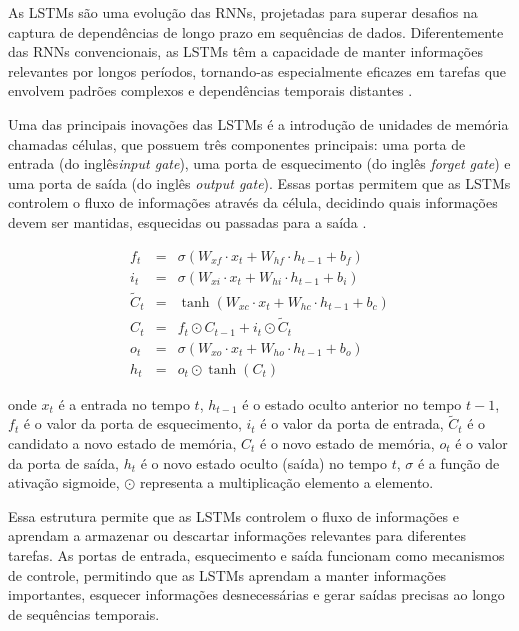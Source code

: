 As LSTMs são uma evolução das RNNs, projetadas para superar desafios na captura de dependências de longo prazo em sequências de dados. Diferentemente das RNNs convencionais, as LSTMs têm a capacidade de manter informações relevantes por longos períodos, tornando-as especialmente eficazes em tarefas que envolvem padrões complexos e dependências temporais distantes \cite{Zhang2021}.

Uma das principais inovações das LSTMs é a introdução de unidades de memória chamadas células, que possuem três componentes principais: uma porta de entrada (do inglês\textit{input gate}), uma porta de esquecimento (do inglês \textit{forget gate}) e uma porta de saída (do inglês \textit{output gate}). Essas portas permitem que as LSTMs controlem o fluxo de informações através da célula, decidindo quais informações devem ser mantidas, esquecidas ou passadas para a saída \cite{Zhang2021}.



\begin{eqnarray}
	f_t &=& \sigma(W_{xf} \cdot x_t + W_{hf} \cdot h_{t-1} + b_f) \\
	i_t &=& \sigma(W_{xi} \cdot x_t + W_{hi} \cdot h_{t-1} + b_i) \\
	\tilde{C}_t &=& \tanh(W_{xc} \cdot x_t + W_{hc} \cdot h_{t-1} + b_c) \\
	C_t &=& f_t \odot C_{t-1} + i_t \odot \tilde{C}_t \\
	o_t &=& \sigma(W_{xo} \cdot x_t + W_{ho} \cdot h_{t-1} + b_o) \\
	h_t &=& o_t \odot \tanh(C_t)
\end{eqnarray}


\noindent onde \(x_t\) é a entrada no tempo \(t\), \(h_{t-1}\) é o estado oculto anterior no tempo \(t-1\), \(f_t\) é o valor da porta de esquecimento, \(i_t\) é o valor da porta de entrada, \(\tilde{C}_t\) é o candidato a novo estado de memória, \(C_t\) é o novo estado de memória, \(o_t\) é o valor da porta de saída, \(h_t\) é o novo estado oculto (saída) no tempo \(t\), \(\sigma\) é a função de ativação sigmoide, \(\odot\) representa a multiplicação elemento a elemento.

Essa estrutura permite que as LSTMs controlem o fluxo de informações e aprendam a armazenar ou descartar informações relevantes para diferentes tarefas. As portas de entrada, esquecimento e saída funcionam como mecanismos de controle, permitindo que as LSTMs aprendam a manter informações importantes, esquecer informações desnecessárias e gerar saídas precisas ao longo de sequências temporais.

